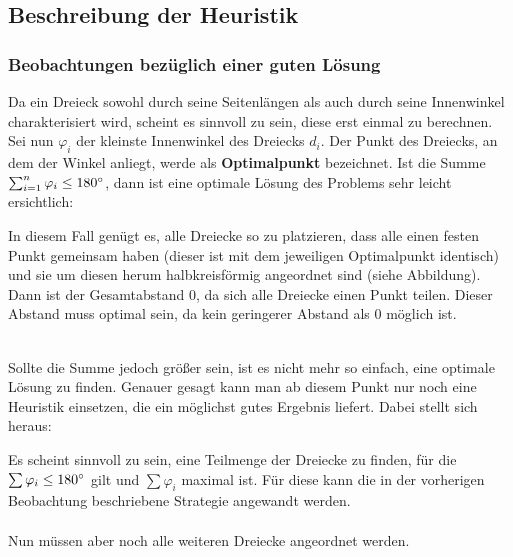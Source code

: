 \documentclass[a4paper, notitlepage, 12pt]{scrartcl}
\begin{document}
  \subsection{Beschreibung der Heuristik}
  \subsubsection{Beobachtungen bezüglich einer guten Lösung}  
  Da ein Dreieck sowohl durch seine Seitenlängen als auch durch seine Innenwinkel charakterisiert wird, scheint es sinnvoll zu sein, diese erst einmal zu berechnen. Sei nun $\varphi_i$ der kleinste Innenwinkel des Dreiecks $d_i$. Der Punkt des Dreiecks, an dem der Winkel anliegt, werde als \textbf{Optimalpunkt} bezeichnet. Ist die Summe $\sum_{i=1}^{n} \varphi_i \leq 180\degree$, dann ist eine optimale Lösung des Problems sehr leicht ersichtlich:
  \begin{kasten}
  	In diesem Fall genügt es, alle Dreiecke so zu platzieren, dass alle einen festen Punkt gemeinsam haben (dieser ist mit dem jeweiligen Optimalpunkt identisch) und sie um diesen herum halbkreisförmig angeordnet sind (siehe Abbildung). Dann ist der Gesamtabstand $0$, da sich alle Dreiecke einen Punkt teilen. Dieser Abstand muss optimal sein, da kein geringerer Abstand als $0$ möglich ist. \\
  	{\centering
  	\par}
  \end{kasten} ~\\
 Sollte die Summe jedoch größer sein, ist es nicht mehr so einfach, eine optimale Lösung zu finden. Genauer gesagt kann man ab diesem Punkt nur noch eine Heuristik einsetzen, die ein möglichst gutes Ergebnis liefert. Dabei stellt sich heraus:
 \begin{kasten}
 	Es scheint sinnvoll zu sein, eine Teilmenge der Dreiecke zu finden, für die $\sum \varphi_i \leq 180\degree$ gilt und $\sum \varphi_i$ maximal ist. Für diese kann die in der vorherigen Beobachtung beschriebene Strategie angewandt werden. \\ \\
 	Nun müssen aber noch alle weiteren Dreiecke angeordnet werden.
 \end{kasten}
\end{document}

